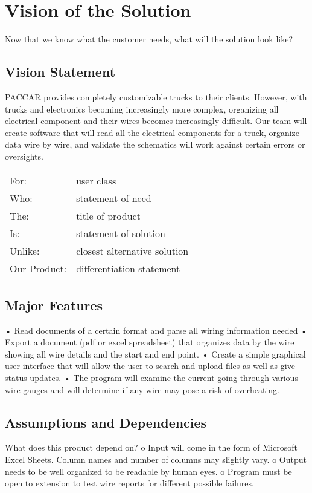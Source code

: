 \section{Vision of the Solution}
Now that we know what the customer needs, 
what will the solution look like? 
\subsection{Vision Statement}
    PACCAR provides completely customizable trucks to their clients. However, with trucks and electronics becoming increasingly more complex, organizing all electrical component and their wires becomes increasingly difficult. Our team will create software that will read all the electrical components for a truck, organize data wire by wire, and validate the schematics will work against certain errors or oversights.  
 \begin{tabular}{ll}
 For:         &user class\\
 Who:         &statement of need\\
 The:         &title of product\\
 Is:          &statement of solution\\
 Unlike:      &closest alternative solution\\
 Our Product: &differentiation statement  \\
 \end{tabular}  
\subsection{Major Features}

•	Read documents of a certain format and parse all wiring information needed
•	Export a document (pdf or excel spreadsheet) that organizes data by the wire showing all wire details and the start and end point.
•	Create a simple graphical user interface that will allow the user to search and upload files as well as give status updates.
•	The program will examine the current going through various wire gauges and will determine if any wire may pose a risk of overheating.

\subsection{Assumptions and Dependencies}
 What does this product depend on?  
o	Input will come in the form of Microsoft Excel Sheets. Column names and number of columns may slightly vary. 
o	Output needs to be well organized to be readable by human eyes. 
o	Program must be open to extension to test wire reports for different possible failures.


